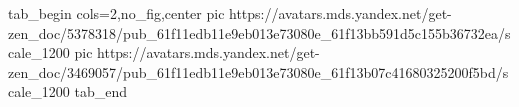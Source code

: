  
 
 
 
 


\ifcmt
  tab_begin cols=2,no_fig,center
     pic https://avatars.mds.yandex.net/get-zen_doc/5378318/pub_61f11edb11e9eb013e73080e_61f13bb591d5c155b36732ea/scale_1200
		 pic https://avatars.mds.yandex.net/get-zen_doc/3469057/pub_61f11edb11e9eb013e73080e_61f13b07c41680325200f5bd/scale_1200
  tab_end
\fi
